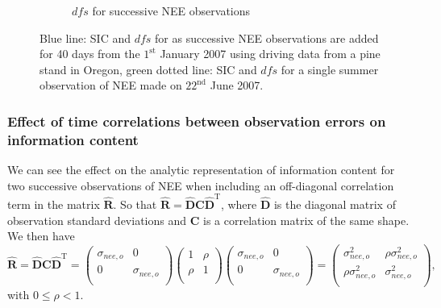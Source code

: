 \begin{figure}[ht]
\begin{subfigure}[b]{0.45\textwidth}
        \caption{\(dfs\) for successive NEE observations}
        \label{chap5:fig:dfs_succ_nee}
    \end{subfigure}
    \caption{Blue line: SIC and \(dfs\) for as successive NEE observations are added for 40 days from the \(1^{\text{st}}\) January 2007 using driving data from a pine stand in Oregon, green dotted line: SIC and \(dfs\) for a single summer observation of NEE made on \( 22^{\text{nd}} \) June 2007. }
    \label{chap5:fig:ic_succ_nee}
\end{figure}

\subsubsection{Effect of time correlations between observation errors on information content}

We can see the effect on the analytic representation of information content for two successive observations of NEE when including an off-diagonal correlation term in the matrix \(\hat{\mathbf{R}}\). So that \(\hat{\mathbf{R}} = \hat{\mathbf{D}}\mathbf{C}\hat{\mathbf{D}}^{\text{T}}\), where \(\hat{\mathbf{D}}\) is the diagonal matrix of observation standard deviations and \(\mathbf{C}\) is a correlation matrix of the same shape. We then have
\begin{equation}
\hat{\mathbf{R}} =  \hat{\mathbf{D}}\mathbf{C}\hat{\mathbf{D}}^{\text{T}} =
\begin{pmatrix}
\sigma_{nee,o} & 0  \\
0 & \sigma_{nee,o}  \\
\end{pmatrix}
\begin{pmatrix}
1 & \rho  \\
\rho & 1  \\
\end{pmatrix}
\begin{pmatrix}
\sigma_{nee,o} & 0  \\
0 & \sigma_{nee,o}  \\
\end{pmatrix}
=
\begin{pmatrix}
\sigma_{nee,o}^{2} & \rho\sigma_{nee,o}^{2}  \\
\rho\sigma_{nee,o}^{2} & \sigma_{nee,o}^{2}  \\
\end{pmatrix},
\end{equation}
with \(0 \leq \rho < 1\).

